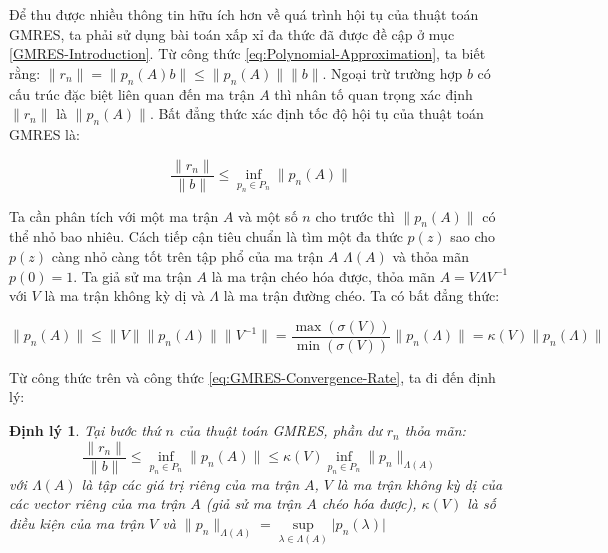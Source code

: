 \documentclass[14pt, a4paper]{article}
\numberwithin{equation}{section}
\numberwithin{algorithm}{section}
\numberwithin{figure}{section}
\newtheorem{dl}{Định lý}
\numberwithin{dl}{section}
\numberwithin{md}{section}
\numberwithin{bd}{section}
\numberwithin{dn}{section}
\begin{document}
Để thu được nhiều thông tin hữu ích hơn về quá trình hội tụ của thuật toán GMRES, ta phải sử dụng bài toán xấp xỉ đa thức đã được đề cập ở mục \ref{GMRES-Introduction}. Từ công thức \ref{eq:Polynomial-Approximation}, ta biết rằng: $\lVert r_n \rVert=\lVert p_n(A)b \rVert \leq \lVert p_n(A) \rVert \lVert b \rVert$. Ngoại trừ trường hợp $b$ có cấu trúc đặc biệt liên quan đến ma trận $A$ thì nhân tố quan trọng xác định $ \lVert r_n \rVert$ là $\lVert p_n(A) \rVert$. Bất đẳng thức xác định tốc độ hội tụ của thuật toán GMRES là:

\begin{equation} \label{eq:GMRES-Convergence-Rate}
    \dfrac{\lVert r_n \rVert}{\lVert b \rVert} \leq \inf_{p_n \in P_n} \lVert p_n(A) \rVert
\end{equation}

Ta cần phân tích với một ma trận $A$ và một số $n$ cho trước thì $\lVert p_n(A) \rVert$ có thể nhỏ bao nhiêu. Cách tiếp cận tiêu chuẩn là tìm một đa thức $p(z)$ sao cho $p(z)$ càng nhỏ càng tốt trên tập phổ của ma trận $A$ $\Lambda(A)$ và thỏa mãn $p(0)=1$. Ta giả sử ma trận $A$ là ma trận chéo hóa được, thỏa mãn $A=V\Lambda V^{-1}$ với $V$ là ma trận không kỳ dị và $\Lambda$ là ma trận đường chéo. Ta có bất đẳng thức:

\begin{equation}
    \lVert p_n(A) \rVert \leq \lVert V \rVert \lVert p_n(\Lambda) \rVert \lVert V^{-1} \rVert = \dfrac{\max(\sigma(V))}{\min(\sigma(V))} \lVert p_n(\Lambda) \rVert = \kappa(V) \lVert p_n(\Lambda) \rVert
\end{equation}

Từ công thức trên và công thức \ref{eq:GMRES-Convergence-Rate}, ta đi đến định lý:

\begin{dl} \label{dl:GMRES-Convergence-Rate}
    Tại bước thứ $n$ của thuật toán GMRES, phần dư $r_n$ thỏa mãn:
    \begin{equation}
        \dfrac{\lVert r_n \rVert}{\lVert b \rVert} \leq \inf_{p_n \in P_n} \lVert p_n(A) \rVert \leq \kappa(V) \inf_{p_n \in P_n} \lVert p_n \rVert_{\Lambda(A)}
    \end{equation}
    với $\Lambda(A)$ là tập các giá trị riêng của ma trận $A$, $V$ là ma trận không kỳ dị của các vector riêng của ma trận $A$ (giả sử ma trận $A$ chéo hóa được), $\kappa(V)$ là số điều kiện của ma trận $V$ và $\lVert p_n \rVert_{\Lambda(A)}=\underset{\lambda \in \Lambda(A)}{\sup} \lvert p_n(\lambda) \rvert$
\end{dl}
\end{document}
